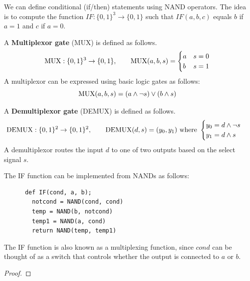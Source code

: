  We can define conditional (if/then) statements using NAND operators. The idea is to compute the function $IF: \{0,1\}^3 \to \{0,1\}$ such that $IF(a, b, c)$ equals $b$ if $a = 1$ and $c$ if $a = 0$. 

  \begin{definition}
    \label{def:multiplexor-gate}
    A \textbf{Multiplexor gate} (MUX) is defined as follows.  
    \begin{equation}
      \operatorname{MUX}: \{0,1\}^3 \to \{0,1\}, \qquad 
      \operatorname{MUX} (a, b, s) = \begin{cases}
        a & s = 0 \\
        b & s = 1
      \end{cases}
    \end{equation}
    A multiplexor can be expressed using basic logic gates as follows:
    \begin{equation}
      \operatorname{MUX}(a, b, s) = (a \wedge \neg s) \vee (b \wedge s)
    \end{equation}
  \end{definition}

  \begin{definition}
    \label{def:demultiplexor-gate}
    A \textbf{Demultiplexor gate} (DEMUX) is defined as follows.  
    \begin{equation}
      \operatorname{DEMUX}: \{0,1\}^2 \to \{0,1\}^2, \qquad 
      \operatorname{DEMUX} (d, s) = (y_0, y_1) \text{ where } \begin{cases}
        y_0 = d \wedge \neg s \\
        y_1 = d \wedge s
      \end{cases}
    \end{equation}
    A demultiplexor routes the input $d$ to one of two outputs based on the select signal $s$.
  \end{definition}

  \begin{definition}
    \label{def:conditional-statement}
    The IF function can be implemented from NANDs as follows: 
    \begin{lstlisting}
      def IF(cond, a, b);
        notcond = NAND(cond, cond) 
        temp = NAND(b, notcond)
        temp1 = NAND(a, cond)
        return NAND(temp, temp1)
    \end{lstlisting}
    The IF function is also known as a multiplexing function, since $cond$ can be thought of as a switch that controls whether the output is connected to $a$ or $b$. 
  \end{definition}
  \begin{proof}
    
  \end{proof}

